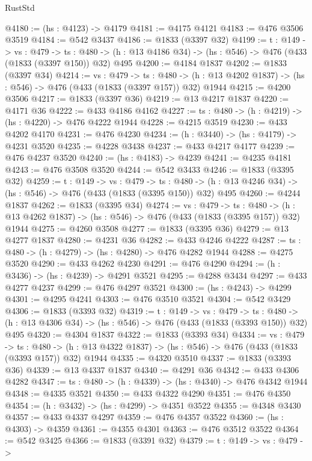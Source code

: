 \begin{lexlean}{RustStd}
\begin{coremodule}
@4180 := (hs : @4123) -> @4179
@4181 := @4175 @4121
@4183 := @476 @3506 @3519
@4184 := @542 @3437
@4186 := @1833 (@3397 @32)
@4199 := {t : @149} ->
  {vs : @479} ->
  {ts : @480} -> (h : @13 @4186 @34) -> (hs : @546) -> @476 (@433 (@1833 (@3397 @150)) @32) @495
@4200 := @4184 @1837
@4202 := @1833 (@3397 @34)
@4214 := {vs : @479} ->
  {ts : @480} -> (h : @13 @4202 @1837) -> (hs : @546) -> @476 (@433 (@1833 (@3397 @157)) @32) @1944
@4215 := @4200 @3506
@4217 := @1833 (@3397 @36)
@4219 := @13 @4217 @1837
@4220 := @4171 @36
@4222 := @433 @4186 @4162
@4227 := {ts : @480} -> (h : @4219) -> (hs : @4220) -> @476 @4222 @1944
@4228 := @4215 @3519
@4230 := @433 @4202 @4170
@4231 := @476 @4230
@4234 := (h : @3440) -> (hs : @4179) -> @4231 @3520
@4235 := @4228 @3438
@4237 := @433 @4217 @4177
@4239 := @476 @4237 @3520
@4240 := (hs : @4183) -> @4239
@4241 := @4235 @4181
@4243 := @476 @3508 @3520
@4244 := @542 @3433
@4246 := @1833 (@3395 @32)
@4259 := {t : @149} ->
  {vs : @479} ->
  {ts : @480} -> (h : @13 @4246 @34) -> (hs : @546) -> @476 (@433 (@1833 (@3395 @150)) @32) @495
@4260 := @4244 @1837
@4262 := @1833 (@3395 @34)
@4274 := {vs : @479} ->
  {ts : @480} -> (h : @13 @4262 @1837) -> (hs : @546) -> @476 (@433 (@1833 (@3395 @157)) @32) @1944
@4275 := @4260 @3508
@4277 := @1833 (@3395 @36)
@4279 := @13 @4277 @1837
@4280 := @4231 @36
@4282 := @433 @4246 @4222
@4287 := {ts : @480} -> (h : @4279) -> (hs : @4280) -> @476 @4282 @1944
@4288 := @4275 @3520
@4290 := @433 @4262 @4230
@4291 := @476 @4290
@4294 := (h : @3436) -> (hs : @4239) -> @4291 @3521
@4295 := @4288 @3434
@4297 := @433 @4277 @4237
@4299 := @476 @4297 @3521
@4300 := (hs : @4243) -> @4299
@4301 := @4295 @4241
@4303 := @476 @3510 @3521
@4304 := @542 @3429
@4306 := @1833 (@3393 @32)
@4319 := {t : @149} ->
  {vs : @479} ->
  {ts : @480} -> (h : @13 @4306 @34) -> (hs : @546) -> @476 (@433 (@1833 (@3393 @150)) @32) @495
@4320 := @4304 @1837
@4322 := @1833 (@3393 @34)
@4334 := {vs : @479} ->
  {ts : @480} -> (h : @13 @4322 @1837) -> (hs : @546) -> @476 (@433 (@1833 (@3393 @157)) @32) @1944
@4335 := @4320 @3510
@4337 := @1833 (@3393 @36)
@4339 := @13 @4337 @1837
@4340 := @4291 @36
@4342 := @433 @4306 @4282
@4347 := {ts : @480} -> (h : @4339) -> (hs : @4340) -> @476 @4342 @1944
@4348 := @4335 @3521
@4350 := @433 @4322 @4290
@4351 := @476 @4350
@4354 := (h : @3432) -> (hs : @4299) -> @4351 @3522
@4355 := @4348 @3430
@4357 := @433 @4337 @4297
@4359 := @476 @4357 @3522
@4360 := (hs : @4303) -> @4359
@4361 := @4355 @4301
@4363 := @476 @3512 @3522
@4364 := @542 @3425
@4366 := @1833 (@3391 @32)
@4379 := {t : @149} ->
  {vs : @479} ->

\end{coremodule}
\end{lexlean}
